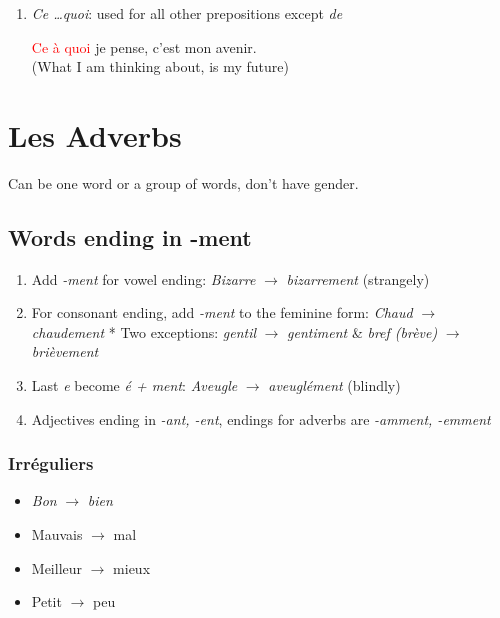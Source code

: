 \documentclass{book}
\begin{document}
\begin{enumerate}
            \item \textit{Ce \dots quoi}: used for all other prepositions except \textit{de}
                \begin{center}
                    \textcolor{red}{Ce à quoi} je pense, c'est mon avenir. \\
                    (What I am thinking about, is my future)
                \end{center}
        \end{enumerate}

\chapter{Les Adverbs}

    Can be one word or a group of words, don't have gender.

    \section{Words ending in -ment}
        \begin{enumerate}
            \item Add \textit{-ment} for vowel ending: \textit{Bizarre} $\to$ \textit{bizarrement} (strangely)
            \item For consonant ending, add \textit{-ment} to the feminine form: \textit{Chaud} $\to$ \textit{chaudement}
                    * Two exceptions: \textit{gentil} $\to$ \textit{gentiment} \& \textit{bref (brève)} $\to$ \textit{brièvement}
            \item Last \textit{e} become \textit{é + ment}: \textit{Aveugle} $\to$ \textit{aveuglément} (blindly)
            \item Adjectives ending in \textit{-ant, -ent}, endings for adverbs are \textit{-amment, -emment}
        \end{enumerate}
        
        \subsection{Irréguliers}
            \begin{itemize}
                \item \textit{Bon} $\to$ \textit{bien}
                \item Mauvais $\to$ mal
                \item Meilleur $\to$ mieux
                \item Petit $\to$ peu
            \end{itemize}
    
\end{document}
